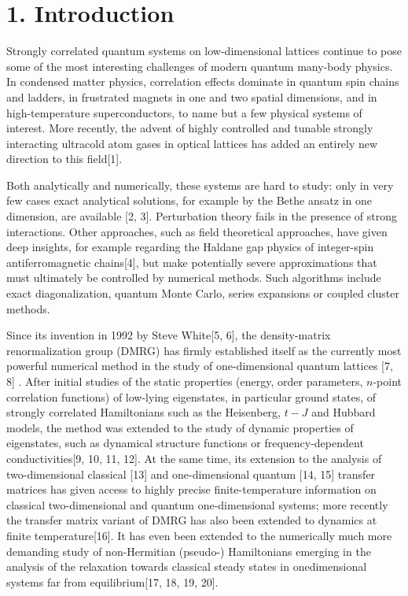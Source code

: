 \documentclass[12pt]{article}
\begin{document}
\section*{1. Introduction}
Strongly correlated quantum systems on low-dimensional lattices continue to pose some of the most interesting challenges of modern quantum many-body physics. In condensed matter physics, correlation effects dominate in quantum spin chains and ladders, in frustrated magnets in one and two spatial dimensions, and in high-temperature superconductors, to name but a few physical systems of interest. More recently, the advent of highly controlled and tunable strongly interacting ultracold atom gases in optical lattices has added an entirely new direction to this field[1].

Both analytically and numerically, these systems are hard to study: only in very few cases exact analytical solutions, for example by the Bethe ansatz in one dimension, are available [2, 3]. Perturbation theory fails in the presence of strong interactions. Other approaches, such as field theoretical approaches, have given deep insights, for example regarding the Haldane gap physics of integer-spin antiferromagnetic chains[4], but make potentially severe approximations that must ultimately be controlled by numerical methods. Such algorithms include exact diagonalization, quantum Monte Carlo, series expansions or coupled cluster methods.

Since its invention in 1992 by Steve White[5, 6], the density-matrix renormalization group (DMRG) has firmly established itself as the currently most powerful numerical method in the study of one-dimensional quantum lattices [7, 8] . After initial studies of the static properties (energy, order parameters, $n$-point correlation functions) of low-lying eigenstates, in particular ground states, of strongly correlated Hamiltonians such as the Heisenberg, $t-J$ and Hubbard models, the method was extended to the study of dynamic properties of eigenstates, such as dynamical structure functions or frequency-dependent conductivities[9, 10, 11, 12]. At the same time, its extension to the analysis of two-dimensional classical [13] and one-dimensional quantum [14, 15] transfer matrices has given access to highly precise finite-temperature information on classical two-dimensional and quantum one-dimensional systems; more recently the transfer matrix variant of DMRG has also been extended to dynamics at finite temperature[16]. It has even been extended to the numerically much more demanding study of non-Hermitian (pseudo-) Hamiltonians emerging in the analysis of the relaxation towards classical steady states in onedimensional systems far from equilibrium[17, 18, 19, 20].
\end{document}
